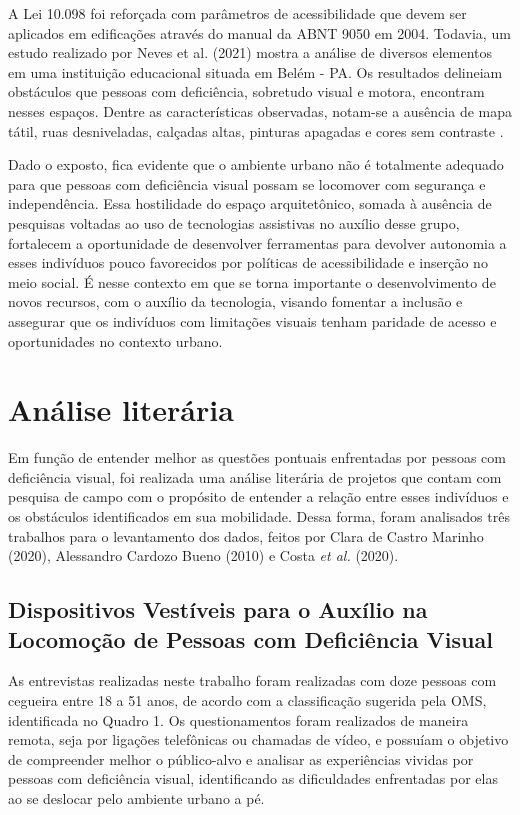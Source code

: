A Lei 10.098 foi reforçada com parâmetros de acessibilidade que devem ser aplicados em edificações através do manual da ABNT 9050 em 2004. Todavia, um estudo realizado por Neves et al. (2021) mostra a análise de diversos elementos em uma instituição educacional situada em Belém - PA. Os resultados delineiam obstáculos que pessoas com deficiência, sobretudo visual e motora, encontram nesses espaços. Dentre as características observadas, notam-se a ausência de mapa tátil, ruas desniveladas, calçadas altas, pinturas apagadas e cores sem contraste \cite{BarreirasArquitetonicas}.  

Dado o exposto, fica evidente que o ambiente urbano não é totalmente adequado para que pessoas com deficiência visual possam se locomover com segurança e independência. Essa hostilidade do espaço arquitetônico, somada à ausência de pesquisas voltadas ao uso de tecnologias assistivas no auxílio desse grupo, fortalecem a oportunidade de desenvolver ferramentas para devolver autonomia a esses indivíduos pouco favorecidos por políticas de acessibilidade e inserção no meio social. É nesse contexto em que se torna importante o desenvolvimento de novos recursos, com o auxílio da tecnologia, visando fomentar a inclusão e assegurar que os indivíduos com limitações visuais tenham paridade de acesso e oportunidades no contexto urbano.

\section{Análise literária}
Em função de entender melhor as questões pontuais enfrentadas por pessoas com deficiência visual, foi realizada uma análise literária de projetos que contam com pesquisa de campo com o propósito de entender a relação entre esses indivíduos e os obstáculos identificados em sua mobilidade. Dessa forma, foram analisados três trabalhos para o levantamento dos dados, feitos por Clara de Castro Marinho (2020), Alessandro Cardozo Bueno (2010) e Costa \textit{et al.} (2020).

\subsection{ Dispositivos Vestíveis para o Auxílio na Locomoção de Pessoas com Deficiência Visual
}

As entrevistas realizadas neste trabalho foram realizadas com doze pessoas com cegueira entre 18 a 51 anos, de acordo com a classificação sugerida pela OMS, identificada no Quadro 1. Os questionamentos foram realizados de maneira remota, seja por ligações telefônicas ou chamadas de vídeo, e possuíam o objetivo de compreender melhor o público-alvo e analisar as experiências vividas por pessoas com deficiência visual, identificando as dificuldades enfrentadas por elas ao se deslocar pelo ambiente urbano a pé.

